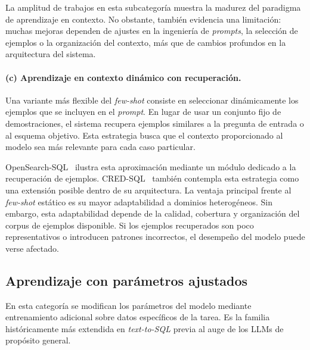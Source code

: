 La amplitud de trabajos en esta subcategoría muestra la madurez del paradigma de aprendizaje en contexto. No obstante, también evidencia una limitación: muchas mejoras dependen de ajustes en la ingeniería de \emph{prompts}, la selección de ejemplos o la organización del contexto, más que de cambios profundos en la arquitectura del sistema.

\paragraph{(c) Aprendizaje en contexto dinámico con recuperación.} 
Una variante más flexible del \emph{few-shot} consiste en seleccionar dinámicamente los ejemplos que se incluyen en el \emph{prompt}. En lugar de usar un conjunto fijo de demostraciones, el sistema recupera ejemplos similares a la pregunta de entrada o al esquema objetivo. Esta estrategia busca que el contexto proporcionado al modelo sea más relevante para cada caso particular.

OpenSearch-SQL~\cite{OpenSearch-SQL2025} ilustra esta aproximación mediante un módulo dedicado a la recuperación de ejemplos. CRED-SQL~\cite{CRED-SQL2025} también contempla esta estrategia como una extensión posible dentro de su arquitectura. La ventaja principal frente al \emph{few-shot} estático es su mayor adaptabilidad a dominios heterogéneos. Sin embargo, esta adaptabilidad depende de la calidad, cobertura y organización del corpus de ejemplos disponible. Si los ejemplos recuperados son poco representativos o introducen patrones incorrectos, el desempeño del modelo puede verse afectado.

\subsection{Aprendizaje con parámetros ajustados}
\label{subsec:sota-d1-tuned}

En esta categoría se modifican los parámetros del modelo mediante
entrenamiento adicional sobre datos específicos de la tarea. Es la familia
históricamente más extendida en \emph{text-to-SQL} previa al auge de los
\acp{LLM} de propósito general.

